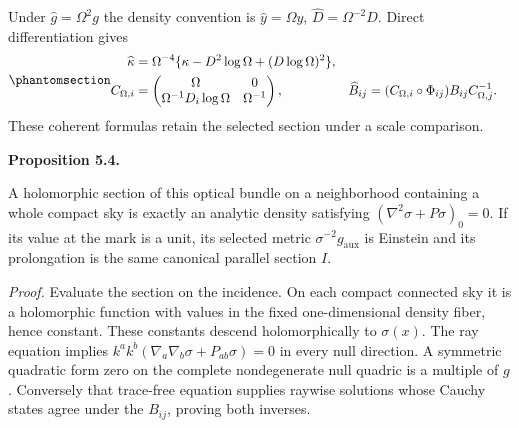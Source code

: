 \documentclass[
  english,
  11pt,
  reqno]{amsart}
\makeatletter
\newcommand{\pandocstatementheading}[1]{%
  \par\addpenalty{\@beginparpenalty}%
  \addvspace{.5\baselineskip plus .2\baselineskip minus .2\baselineskip}%
  {\normalfont\bfseries #1\par}%
  \nobreak\@afterindenttrue\@afterheading
}
\makeatother
\begin{document}
Under \(\widehat g=\Omega^2g\) the density convention is
\(\widehat y=\Omega y\), \(\widehat D=\Omega^{-2}D\). Direct
differentiation gives
\begin{equation}\protect\phantomsection\label{eq:gg-optical-density-covariance}{
 \begin{aligned}
 \widehat\kappa
   &=\Omega^{-4}\{\kappa-D^2\log\Omega+(D\log\Omega)^2\},\\
 C_{\Omega,i}
   &=\begin{pmatrix}
       \Omega&0\\\Omega^{-1}D_i\log\Omega&\Omega^{-1}
      \end{pmatrix},&
 \widehat B_{ij}
   &=(C_{\Omega,i}\circ\Phi_{ij})B_{ij}C_{\Omega,j}^{-1}.
 \end{aligned}
}\end{equation} These coherent formulas retain the selected section
under a scale comparison.

\pandocstatementheading{\protect{}\label{prop:gg-optical-einstein}Proposition 5.4.}

A holomorphic section of this optical bundle on a neighborhood
containing a whole compact sky is exactly an analytic density satisfying
\((\nabla^2\sigma+P\sigma)_0=0\). If its value at the mark is a unit,
its selected metric \(\sigma^{-2}g_{\mathrm{aux}}\) is Einstein and its
prolongation is the same canonical parallel section \(I\).

\emph{Proof.} Evaluate the section on the incidence. On each compact
connected sky it is a holomorphic function with values in the fixed
one-dimensional density fiber, hence constant. These constants descend
holomorphically to \(\sigma(x)\). The ray equation implies
\(k^ak^b(\nabla_a\nabla_b\sigma+P_{ab}\sigma)=0\) in every null
direction. A symmetric quadratic form zero on the complete nondegenerate
null quadric is a multiple of \(g\). Conversely that trace-free equation
supplies raywise solutions whose Cauchy states agree under the
\(B_{ij}\), proving both inverses.
\end{document}
